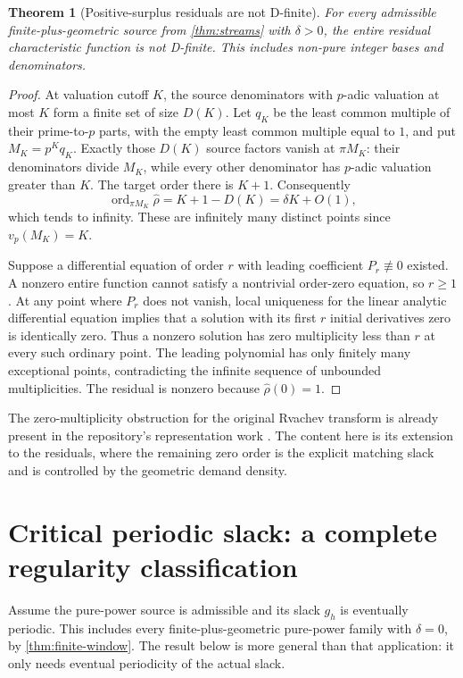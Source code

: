\documentclass[11pt,a4paper]{article}
\newtheorem{theorem}{Theorem}[section]
\theoremstyle{remark}
\newcommand{\ord}{\operatorname{ord}}
\newcommand{\cf}[1]{\widehat{#1}}
\begin{document}
\begin{theorem}[Positive-surplus residuals are not D-finite]
\label{thm:nonDfinite}
For every admissible finite-plus-geometric source from \cref{thm:streams}
with $\delta>0$, the entire residual characteristic function is not D-finite.
This includes non-pure integer bases and denominators.
\end{theorem}
\begin{proof}
At valuation cutoff $K$, the source denominators with $p$-adic valuation at
most $K$ form a finite set of size $D(K)$. Let $q_K$ be the least common
multiple of their prime-to-$p$ parts, with the empty least common multiple
equal to $1$, and put $M_K=p^Kq_K$. Exactly those $D(K)$ source factors vanish
at $\pi M_K$: their denominators divide $M_K$, while every other denominator
has $p$-adic valuation greater than $K$. The target order there is $K+1$.
Consequently
\[
 \ord_{\pi M_K}\cf\rho=K+1-D(K)=\delta K+O(1),
\]
which tends to infinity. These are infinitely many distinct points since
$v_p(M_K)=K$.

Suppose a differential equation of order $r$ with leading coefficient
$P_r\not\equiv0$ existed. A nonzero entire function cannot satisfy a nontrivial
order-zero equation, so $r\ge1$. At any point where $P_r$ does not vanish,
local uniqueness for the linear analytic differential equation implies that a
solution with its first $r$ initial derivatives zero is identically zero.
Thus a nonzero solution has zero multiplicity less than $r$ at every such
ordinary point. The leading polynomial has only finitely many exceptional
points, contradicting the infinite sequence of unbounded multiplicities.
The residual is nonzero because $\cf\rho(0)=1$.
\end{proof}

The zero-multiplicity obstruction for the original Rvachev transform is already
present in the repository's representation work \cite{RepoAudit}. The content
here is its extension to the residuals, where the remaining zero order is the
explicit matching slack and is controlled by the geometric demand density.

\section{Critical periodic slack: a complete regularity classification}
\label{sec:critical}

Assume the pure-power source is admissible and its slack $g_h$ is eventually
periodic. This includes every finite-plus-geometric pure-power family with
$\delta=0$, by \cref{thm:finite-window}. The result below is more general than
that application: it only needs eventual periodicity of the actual slack.
\end{document}
